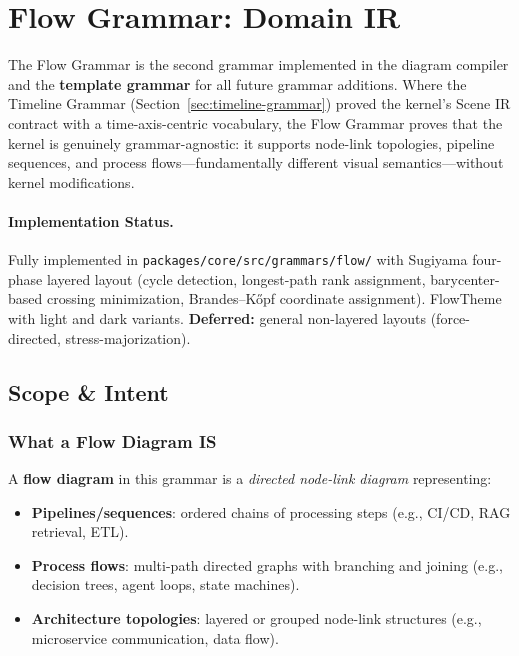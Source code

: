 \section{Flow Grammar: Domain IR}
\label{sec:flow-grammar}

The Flow Grammar is the second grammar implemented in the diagram compiler and the \textbf{template grammar} for all future grammar additions. Where the Timeline Grammar (Section~\ref{sec:timeline-grammar}) proved the kernel's Scene IR contract with a time-axis-centric vocabulary, the Flow Grammar proves that the kernel is genuinely grammar-agnostic: it supports node-link topologies, pipeline sequences, and process flows---fundamentally different visual semantics---without kernel modifications.

\paragraph{Implementation Status.}
Fully implemented in \texttt{packages/core/src/grammars/flow/} with Sugiyama four-phase layered layout (cycle detection, longest-path rank assignment, barycenter-based crossing minimization, Brandes--K\H{o}pf coordinate assignment). FlowTheme with light and dark variants. \textbf{Deferred:} general non-layered layouts (force-directed, stress-majorization).

\subsection{Scope \& Intent}
\label{sec:flow-scope}

\subsubsection{What a Flow Diagram IS}

A \textbf{flow diagram} in this grammar is a \emph{directed node-link diagram} representing:

\begin{itemize}
  \item \textbf{Pipelines/sequences}: ordered chains of processing steps (e.g., CI/CD, RAG retrieval, ETL).
  \item \textbf{Process flows}: multi-path directed graphs with branching and joining (e.g., decision trees, agent loops, state machines).
  \item \textbf{Architecture topologies}: layered or grouped node-link structures (e.g., microservice communication, data flow).
\end{itemize}

